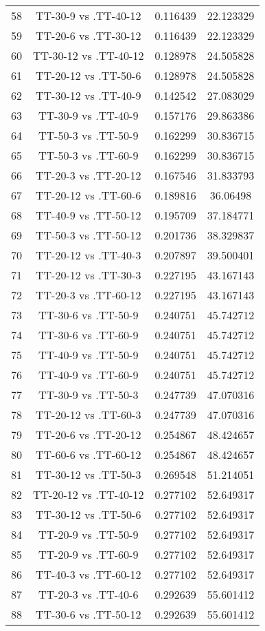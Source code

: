 \documentclass[a4paper,10pt]{article}
\begin{document}
\begin{landscape}
\begin{table}[!htp]
\begin{tabular}{cccc}
58&TT-30-9 vs .TT-40-12&0.116439&22.123329\\
59&TT-20-6 vs .TT-30-12&0.116439&22.123329\\
60&TT-30-12 vs .TT-40-12&0.128978&24.505828\\
61&TT-20-12 vs .TT-50-6&0.128978&24.505828\\
62&TT-30-12 vs .TT-40-9&0.142542&27.083029\\
63&TT-30-9 vs .TT-40-9&0.157176&29.863386\\
64&TT-50-3 vs .TT-50-9&0.162299&30.836715\\
65&TT-50-3 vs .TT-60-9&0.162299&30.836715\\
66&TT-20-3 vs .TT-20-12&0.167546&31.833793\\
67&TT-20-12 vs .TT-60-6&0.189816&36.06498\\
68&TT-40-9 vs .TT-50-12&0.195709&37.184771\\
69&TT-50-3 vs .TT-50-12&0.201736&38.329837\\
70&TT-20-12 vs .TT-40-3&0.207897&39.500401\\
71&TT-20-12 vs .TT-30-3&0.227195&43.167143\\
72&TT-20-3 vs .TT-60-12&0.227195&43.167143\\
73&TT-30-6 vs .TT-50-9&0.240751&45.742712\\
74&TT-30-6 vs .TT-60-9&0.240751&45.742712\\
75&TT-40-9 vs .TT-50-9&0.240751&45.742712\\
76&TT-40-9 vs .TT-60-9&0.240751&45.742712\\
77&TT-30-9 vs .TT-50-3&0.247739&47.070316\\
78&TT-20-12 vs .TT-60-3&0.247739&47.070316\\
79&TT-20-6 vs .TT-20-12&0.254867&48.424657\\
80&TT-60-6 vs .TT-60-12&0.254867&48.424657\\
81&TT-30-12 vs .TT-50-3&0.269548&51.214051\\
82&TT-20-12 vs .TT-40-12&0.277102&52.649317\\
83&TT-30-12 vs .TT-50-6&0.277102&52.649317\\
84&TT-20-9 vs .TT-50-9&0.277102&52.649317\\
85&TT-20-9 vs .TT-60-9&0.277102&52.649317\\
86&TT-40-3 vs .TT-60-12&0.277102&52.649317\\
87&TT-20-3 vs .TT-40-6&0.292639&55.601412\\
88&TT-30-6 vs .TT-50-12&0.292639&55.601412\\

\end{tabular}
\end{table}
\end{landscape}
\end{document}
